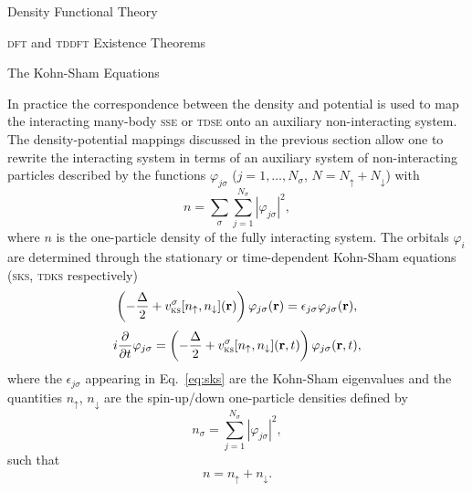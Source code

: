\documentclass[letterpaper, 11 pt]{report}
\begin{document}
\begin{chapter}{Density Functional Theory \label{chap:dft}}
\begin{section}{\textsc{dft} and \textsc{tddft} Existence Theorems \label{sec:dft}}
   \end{section}

   \begin{section}{The Kohn-Sham Equations \label{sec:ks}}

      In practice the correspondence between the density and potential is used to map the interacting
      many-body \textsc{sse} or \textsc{tdse} onto an auxiliary non-interacting system. The
      density-potential mappings discussed in the previous section allow one to rewrite the interacting
      system in terms of an auxiliary system of non-interacting particles described by the functions
      $\varphi_{j\sigma}$ ($j = 1, \dots, N_\sigma$, $N = N_\uparrow + N_\downarrow$) with
      \begin{equation} \label{eq:dendef2}
         n = \sum\limits_{\sigma} \sum\limits_{j = 1}^{N_\sigma}
                           \left| \varphi_{j\sigma} \right|^2,
      \end{equation}
      where $n$ is the one-particle density of the fully interacting system. The orbitals $\varphi_i$
      are determined through the stationary or time-dependent Kohn-Sham equations~\cite{ks-eq,
      spin-dep1, spin-dep3, tdks} (\textsc{sks}, \textsc{tdks} respectively)
      \begin{equation} \label{eq:sks}
         \left( -\frac{\Delta}{2} + v^\sigma_\mathrm{\textsc{ks}}[n_\uparrow,
         n_\downarrow](\mathbf{r}) \right)
          \varphi_{j\sigma}(\mathbf{r}) = \epsilon_{j \sigma} \varphi_{j \sigma}(\mathbf{r}),
      \end{equation}
      \begin{equation} \label{eq:tdks}
         i \frac{\partial}{\partial t} \varphi_{j\sigma} =
            \left( -\frac{\Delta}{2} +
            v^\sigma_\mathrm{\textsc{ks}}[n_\uparrow, n_\downarrow](\mathbf{r},t)
            \right) \varphi_{j\sigma}(\mathbf{r},t),
      \end{equation}
      where the $\epsilon_{j \sigma}$ appearing in Eq.~\eqref{eq:sks} are the Kohn-Sham eigenvalues and
      the quantities $n_\uparrow$, $n_\downarrow$ are the spin-up/down one-particle densities defined by
      \begin{equation} \label{eq:spinden}
         n_\sigma = \sum\limits_{j=1}^{N_\sigma} \left| \varphi_{j\sigma} \right|^2,
      \end{equation}
      such that
      \begin{equation} \label{eq:denconstraint}
         n = n_\uparrow + n_\downarrow.
      \end{equation}


\end{section}
\end{chapter}
\end{document}
